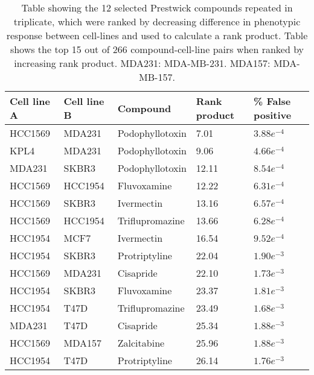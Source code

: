 \documentclass[a4paper,11pt,twoside,openright]{scrbook}
\begin{document}
\begin{table}[]
    \captionsetup{width=0.8\textwidth}
    \caption[Rank products of top 15 Prestwick hits followed up in triplicate]{
    Table showing the 12 selected Prestwick compounds repeated in triplicate, which were ranked by decreasing 
difference in phenotypic response between cell-lines and used to calculate a rank product.
    Table shows the top 15 out of 266 compound-cell-line pairs when ranked by increasing rank product.
    MDA231: MDA-MB-231. MDA157: MDA-MB-157.
    }
\begin{footnotesize}
\begin{tabular}{@{}lllll@{}}
\toprule
Cell line A & Cell line B & Compound        & Rank product & \% False positive \\ \midrule
HCC1569     & MDA231      & Podophyllotoxin & 7.01         & $3.88e^{-4}$      \\
KPL4        & MDA231      & Podophyllotoxin & 9.06         & $4.66e^{-4}$      \\
MDA231      & SKBR3       & Podophyllotoxin & 12.11        & $8.54e^{-4}$      \\
HCC1569     & HCC1954     & Fluvoxamine     & 12.22        & $6.31e^{-4}$      \\
HCC1569     & SKBR3       & Ivermectin      & 13.16        & $6.57e^{-4}$      \\
HCC1569     & HCC1954     & Triflupromazine & 13.66        & $6.28e^{-4}$      \\
HCC1954     & MCF7        & Ivermectin      & 16.54        & $9.52e^{-4}$      \\
HCC1954     & SKBR3       & Protriptyline   & 22.04        & $1.90e^{-3}$      \\
HCC1569     & MDA231      & Cisapride       & 22.10        & $1.73e^{-3}$      \\
HCC1954     & SKBR3       & Fluvoxamine     & 23.37        & $1.81e^{-3}$      \\
HCC1954     & T47D        & Triflupromazine & 23.49        & $1.68e^{-3}$      \\
MDA231      & T47D        & Cisapride       & 25.34        & $1.88e^{-3}$      \\
HCC1569     & MDA157      & Zalcitabine     & 25.96        & $1.88e^{-3}$      \\
HCC1954     & T47D        & Protriptyline   & 26.14        & $1.76e^{-3}$      \\ \bottomrule
\end{tabular}
\end{footnotesize}
\label{table:rank_products}
\end{table}
\end{document}
